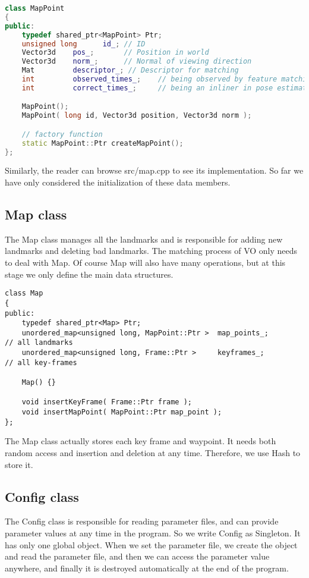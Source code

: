 \begin{lstlisting}[language=c++,caption=slambook/project/0.1/include/myslam/mappoint.h]
class MapPoint
{
public:
	typedef shared_ptr<MapPoint> Ptr;
	unsigned long      id_; // ID
	Vector3d    pos_;       // Position in world
	Vector3d    norm_;      // Normal of viewing direction 
	Mat         descriptor_; // Descriptor for matching 
	int         observed_times_;    // being observed by feature matching algo.
	int         correct_times_;     // being an inliner in pose estimation

	MapPoint();
	MapPoint( long id, Vector3d position, Vector3d norm );

	// factory function
	static MapPoint::Ptr createMapPoint();
};
\end{lstlisting}

Similarly, the reader can browse src/map.cpp to see its implementation. So far we have only considered the initialization of these data members.

\subsection{Map class}
The Map class manages all the landmarks and is responsible for adding new landmarks and deleting bad landmarks. The matching process of VO only needs to deal with Map. Of course Map will also have many operations, but at this stage we only define the main data structures.

\begin{lstlisting}[language = c ++, caption = slambook/project/0.1/include/myslam/map.h]
class Map
{
public:
	typedef shared_ptr<Map> Ptr;
	unordered_map<unsigned long, MapPoint::Ptr >  map_points_;        // all landmarks
	unordered_map<unsigned long, Frame::Ptr >     keyframes_;         // all key-frames

	Map() {}
	
	void insertKeyFrame( Frame::Ptr frame );
	void insertMapPoint( MapPoint::Ptr map_point );
};
\end{lstlisting}

The Map class actually stores each key frame and waypoint. It needs both random access and insertion and deletion at any time. Therefore, we use Hash to store it.

\subsection{Config class}

The Config class is responsible for reading parameter files, and can provide parameter values ​​at any time in the program. So we write Config as Singleton. It has only one global object. When we set the parameter file, we create the object and read the parameter file, and then we can access the parameter value anywhere, and finally it is destroyed automatically at the end of the program.

